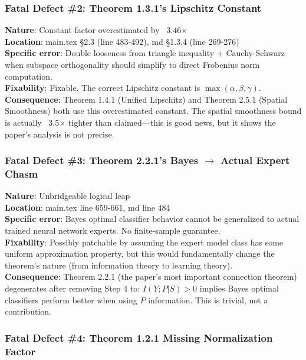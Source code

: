 \documentclass[
  12pt,
]{article}
\begin{document}
\subsubsection{Fatal Defect \#2: Theorem 1.3.1's Lipschitz Constant}\label{fatal-2}

\textbf{Nature}: Constant factor overestimated by ~3.46$\times$\\
\textbf{Location}: main.tex \S2.3 (line 483-492), md \S1.3.4 (line 269-276)\\
\textbf{Specific error}: Double looseness from triangle inequality + Cauchy-Schwarz when subspace orthogonality should simplify to direct Frobenius norm computation.\\
\textbf{Fixability}: Fixable. The correct Lipschitz constant is \(\max(\alpha, \beta, \gamma)\).\\
\textbf{Consequence}: Theorem 1.4.1 (Unified Lipschitz) and Theorem 2.5.1 (Spatial Smoothness) both use this overestimated constant. The spatial smoothness bound is actually ~3.5$\times$ tighter than claimed---this is good news, but it shows the paper's analysis is not precise.

\subsubsection{Fatal Defect \#3: Theorem 2.2.1's Bayes $\to$ Actual Expert Chasm}\label{fatal-3}

\textbf{Nature}: Unbridgeable logical leap\\
\textbf{Location}: main.tex line 659-661, md line 484\\
\textbf{Specific error}: Bayes optimal classifier behavior cannot be generalized to actual trained neural network experts. No finite-sample guarantee.\\
\textbf{Fixability}: Possibly patchable by assuming the expert model class has some uniform approximation property, but this would fundamentally change the theorem's nature (from information theory to learning theory).\\
\textbf{Consequence}: Theorem 2.2.1 (the paper's most important connection theorem) degenerates after removing Step 4 to: \(I(Y;P|S) > 0\) implies Bayes optimal classifiers perform better when using \(P\) information. This is trivial, not a contribution.

\subsubsection{Fatal Defect \#4: Theorem 1.2.1 Missing Normalization Factor}\label{fatal-4}
\end{document}
